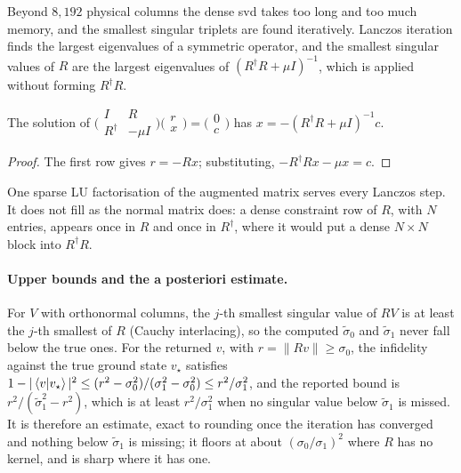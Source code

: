Beyond $8{,}192$ physical columns the dense \gls{svd} takes too long and too much memory, and the smallest singular triplets are found iteratively. Lanczos iteration finds the largest eigenvalues of a symmetric operator, and the smallest singular values of $R$ are the largest eigenvalues of $(R^\dagger R+\mu I)^{-1}$, which is applied without forming $R^\dagger R$.

\begin{proposition}
The solution of $\bigl(\begin{smallmatrix}I&R\\R^\dagger&-\mu I\end{smallmatrix}\bigr)\bigl(\begin{smallmatrix}r\\x\end{smallmatrix}\bigr)=\bigl(\begin{smallmatrix}0\\c\end{smallmatrix}\bigr)$ has $x=-(R^\dagger R+\mu I)^{-1}c$.
\end{proposition}
\begin{proof}
The first row gives $r=-Rx$; substituting, $-R^\dagger Rx-\mu x=c$.
\end{proof}

One sparse LU factorisation of the augmented matrix serves every Lanczos step. It does not fill as the normal matrix does: a dense constraint row of $R$, with $N$ entries, appears once in $R$ and once in $R^\dagger$, where it would put a dense $N\times N$ block into $R^\dagger R$.

\paragraph{Upper bounds and the a posteriori estimate.} For $V$ with orthonormal columns, the $j$-th smallest singular value of $RV$ is at least the $j$-th smallest of $R$ (Cauchy interlacing), so the computed $\tilde\sigma_0$ and $\tilde\sigma_1$ never fall below the true ones. For the returned $v$, with $r=\|Rv\|\ge\sigma_0$, the infidelity against the true ground state $v_\star$ satisfies $1-|\braket{v|v_\star}|^2\le(r^2-\sigma_0^2)/(\sigma_1^2-\sigma_0^2)\le r^2/\sigma_1^2$, and the reported bound is $r^2/(\tilde\sigma_1^2-r^2)$, which is at least $r^2/\sigma_1^2$ when no singular value below $\tilde\sigma_1$ is missed. It is therefore an estimate, exact to rounding once the iteration has converged and nothing below $\tilde\sigma_1$ is missing; it floors at about $(\sigma_0/\sigma_1)^2$ where $R$ has no kernel, and is sharp where it has one.

